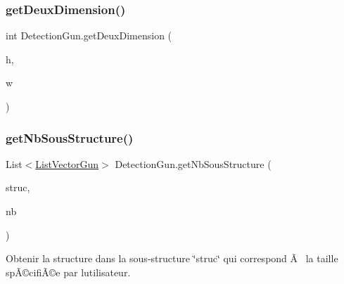 \subsubsection{\texorpdfstring{get\+Deux\+Dimension()}{getDeuxDimension()}}
{\footnotesize\ttfamily int Detection\+Gun.\+get\+Deux\+Dimension (\begin{DoxyParamCaption}\item[{int}]{h,  }\item[{int}]{w }\end{DoxyParamCaption})\hspace{0.3cm}{\ttfamily [inline]}}

\mbox{\label{class_detection_gun_a0a14866d2727aea5d457121bd646f3bb}} 
\subsubsection{\texorpdfstring{get\+Nb\+Sous\+Structure()}{getNbSousStructure()}}
{\footnotesize\ttfamily List$<$\mbox{\hyperlink{class_list_vector_gun}{List\+Vector\+Gun}}$>$ Detection\+Gun.\+get\+Nb\+Sous\+Structure (\begin{DoxyParamCaption}\item[{List$<$ \mbox{\hyperlink{class_list_vector_gun}{List\+Vector\+Gun}} $>$}]{struc,  }\item[{int}]{nb }\end{DoxyParamCaption})\hspace{0.3cm}{\ttfamily [inline]}}



Obtenir la structure dans la sous-\/structure \char`\"{}struc\char`\"{} qui correspond Ã  la taille spÃ©cifiÃ©e par l\textquotesingle{}utilisateur. 


